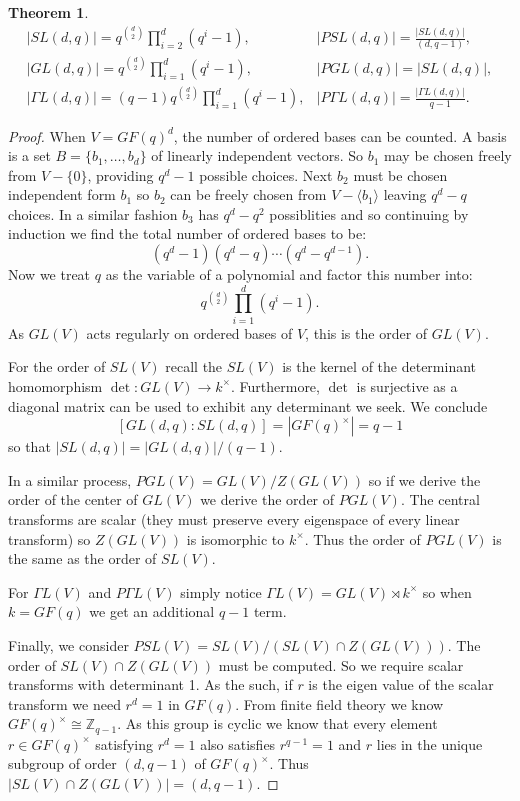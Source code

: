 \documentclass[12pt]{article}
\newtheorem{thm}{Theorem}
\providecommand{\intersect}{\cap}
\begin{document}
\begin{thm}\label{thm:lin}
\[
\begin{array}{cc}
|SL(d,q)| = q^{\binom{d}{2}} \prod_{i=2}^d (q^i-1), 
  & |PSL(d,q)|=\frac{|SL(d,q)|}{(d,q-1)},\\
|GL(d,q)|  =  q^{\binom{d}{2}} \prod_{i=1}^d (q^i-1), 
  & |PGL(d,q)|=|SL(d,q)|,\\
|\Gamma L(d,q)|  =  (q-1) q^{\binom{d}{2}} \prod_{i=1}^d (q^i-1),
  & |P\Gamma L(d,q)|=\frac{|\Gamma L(d,q)|}{q-1}.
\end{array}
\]
\end{thm}
\begin{proof}
When $V=GF(q)^d$, the number of ordered bases can be counted.  A basis
is a set $B=\{b_1,\dots,b_d\}$ of linearly independent vectors.  So 
$b_1$ may be chosen freely from $V-\{0\}$, providing $q^d-1$ possible choices.
Next $b_2$ must be chosen independent form $b_1$ so $b_2$ can be freely 
chosen from $V-\langle b_1\rangle$ leaving $q^d-q$ choices.  In a similar fashion $b_3$ has $q^d-q^2$ possiblities and so continuing by induction we
find the total number of ordered bases to be:
\[(q^d-1)(q^d-q)\cdots (q^d-q^{d-1}).\]
Now we treat $q$ as the variable of a polynomial and factor this number into:
\[q^{\binom{d}{2}} \prod_{i=1}^d (q^i-1).\]
As $GL(V)$ acts regularly on ordered bases of $V$, this is the order of $GL(V)$.

For the order of $SL(V)$ recall the $SL(V)$ is the kernel of the determinant
homomorphism $\det:GL(V)\rightarrow k^\times$.  Furthermore, $\det$ is
surjective as a diagonal matrix can be used to exhibit any determinant we seek.  We conclude 
\[[GL(d,q):SL(d,q)]=|GF(q)^\times|=q-1\]
so that $|SL(d,q)|=|GL(d,q)|/(q-1)$.

In a similar process, $PGL(V)=GL(V)/Z(GL(V))$ so if we derive the order of the
center of $GL(V)$ we derive the order of $PGL(V)$.  The central transforms
are scalar (they must preserve every eigenspace of every linear transform) so 
$Z(GL(V))$ is isomorphic to $k^\times$.  Thus the order of $PGL(V)$ is the same as the order of $SL(V)$.

For $\Gamma L(V)$ and $P\Gamma L(V)$ simply notice $\Gamma L(V)=GL(V)\rtimes k^\times$ so when $k=GF(q)$ we get an additional $q-1$ term.

Finally, we consider $PSL(V)=SL(V)/(SL(V)\intersect Z(GL(V)))$.  The order of $SL(V)\intersect Z(GL(V))$ must be computed.  So we require scalar transforms with determinant 1.  As the such, if $r$ is the eigen value of the scalar transform we need $r^d=1$ in $GF(q)$.  From finite field theory we know $GF(q)^\times \cong \mathbb{Z}_{q-1}$.  As this group is cyclic we know that every element $r\in GF(q)^\times$ satisfying $r^d=1$ also satisfies $r^{q-1}=1$ and $r$ lies in the unique subgroup of order $(d,q-1)$ of $GF(q)^\times$.
Thus $|SL(V)\intersect Z(GL(V))|=(d,q-1)$.
\end{proof}

\end{document}
